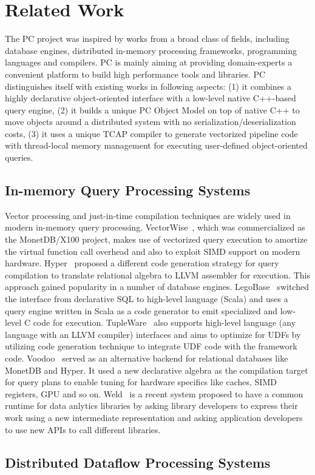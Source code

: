 
\section{Related Work}

The PC project was inspired by works from a broad class of
fields, including database engines, distributed in-memory processing
frameworks,  programming languages and compilers. PC is
mainly aiming at providing domain-experts a convenient platform to build high
performance tools and libraries. PC distinguishes itself with existing
works in following aspects:
(1) it combines a highly declarative object-oriented interface with a
low-level native
C++-based query engine, (2) it builds a unique PC Object Model on top of
native C++ to move objects around a distributed system with no
serialization/deserialization costs, (3) it uses a unique TCAP compiler to generate vectorized
pipeline code with thread-local memory management for executing
user-defined object-oriented queries.

\subsection {In-memory Query Processing Systems}
Vector processing and just-in-time compilation techniques are widely
used in modern in-memory query
processing. VectorWise~\cite{zukowski2012vectorwise}, which was
commercialized as the MonetDB/X100 project, makes use of vectorized
query execution to amortize the virtual function call overhead and
also to exploit SIMD support on modern hardware.
Hyper~\cite{neumann2011efficiently} proposed a different code
generation strategy for query compilation to translate relational
algebra to LLVM assembler for execution. This approach gained
popularity in a number of database
engines. LegoBase~\cite{klonatos2014building} switched the interface
from declarative SQL to high-level language (Scala) and uses a query engine
written in Scala as a code generator to emit specialized and low-level
C code for execution. TupleWare~\cite{crotty2015tupleware} also supports
high-level language (any language with an LLVM compiler) interfaces
and aims to
optimize for UDFs by utilizing code
generation technique to integrate UDF code with the framework
code. Voodoo~\cite{pirk2016voodoo} served as an alternative backend for
relational databases like MonetDB and Hyper. It used a new
declarative algebra as the compilation target for query plans to
enable tuning for hardware specifics like caches, SIMD registers,
GPU and so on. Weld~\cite{palkar2017weld} is a recent system proposed
to have a common runtime for data anlytics libraries by asking library
developers to express their work using a new intermediate
representation and asking application developers to use new APIs to
call different libraries.

\subsection{Distributed Dataflow Processing Systems}

